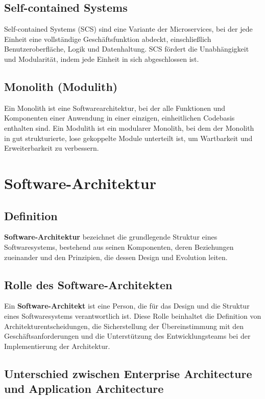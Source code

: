 \subsection{Self-contained Systems}
Self-contained Systems (SCS) sind eine Variante der Microservices, bei der jede Einheit eine vollständige Geschäftsfunktion abdeckt, einschließlich Benutzeroberfläche, Logik und Datenhaltung. SCS fördert die Unabhängigkeit und Modularität, indem jede Einheit in sich abgeschlossen ist.

\subsection{Monolith (Modulith)}
Ein Monolith ist eine Softwarearchitektur, bei der alle Funktionen und Komponenten einer Anwendung in einer einzigen, einheitlichen Codebasis enthalten sind. Ein Modulith ist ein modularer Monolith, bei dem der Monolith in gut strukturierte, lose gekoppelte Module unterteilt ist, um Wartbarkeit und Erweiterbarkeit zu verbessern.

\section{Software-Architektur}

\subsection{Definition}

\textbf{Software-Architektur} bezeichnet die grundlegende Struktur eines Softwaresystems, bestehend aus seinen Komponenten, deren Beziehungen zueinander und den Prinzipien, die dessen Design und Evolution leiten.

\subsection{Rolle des Software-Architekten}

Ein \textbf{Software-Architekt} ist eine Person, die für das Design und die Struktur eines Softwaresystems verantwortlich ist. Diese Rolle beinhaltet die Definition von Architekturentscheidungen, die Sicherstellung der Übereinstimmung mit den Geschäftsanforderungen und die Unterstützung des Entwicklungsteams bei der Implementierung der Architektur.

\subsection{Unterschied zwischen Enterprise Architecture und Application Architecture}

